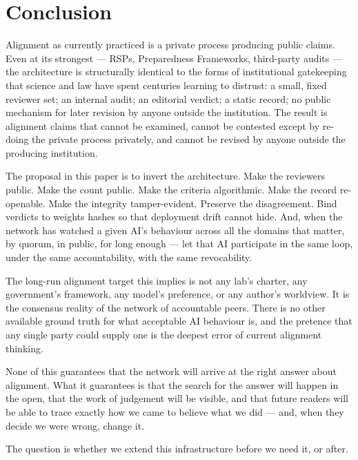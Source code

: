 \documentclass[11pt,a4paper]{article}
\begin{document}
\section{Conclusion}

Alignment as currently practiced is a private process producing
public claims. Even at its strongest --- RSPs, Preparedness
Frameworks, third-party audits --- the architecture is
structurally identical to the forms of institutional gatekeeping
that science and law have spent centuries learning to distrust:
a small, fixed reviewer set; an internal audit; an editorial
verdict; a static record; no public mechanism for later revision
by anyone outside the institution. The result is alignment
claims that cannot be examined, cannot be contested except by
re-doing the private process privately, and cannot be revised by
anyone outside the producing institution.

The proposal in this paper is to invert the architecture. Make
the reviewers public. Make the count public. Make the criteria
algorithmic. Make the record re-openable. Make the integrity
tamper-evident. Preserve the disagreement. Bind verdicts to
weights hashes so that deployment drift cannot hide. And, when
the network has watched a given AI's behaviour across all the
domains that matter, by quorum, in public, for long enough ---
let that AI participate in the same loop, under the same
accountability, with the same revocability.

The long-run alignment target this implies is not any lab's
charter, any government's framework, any model's preference, or
any author's worldview. It is the consensus reality of the
network of accountable peers. There is no other available
ground truth for what acceptable AI behaviour is, and the
pretence that any single party could supply one is the deepest
error of current alignment thinking.

None of this guarantees that the network will arrive at the
right answer about alignment. What it guarantees is that the
search for the answer will happen in the open, that the work of
judgement will be visible, and that future readers will be able
to trace exactly how we came to believe what we did --- and,
when they decide we were wrong, change it.

The question is whether we extend this infrastructure before we
need it, or after.
\end{document}
